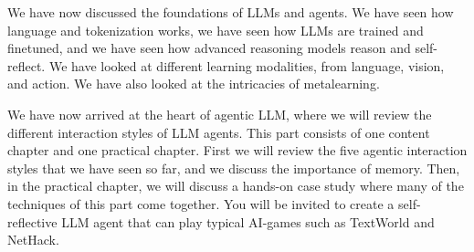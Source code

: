 We have now discussed the foundations of LLMs and agents. We have seen how language and tokenization works, we have seen how LLMs are trained and finetuned, and we have seen how advanced reasoning models reason and self-reflect. We have looked at different learning modalities, from language, vision, and action.  We have also looked at the intricacies of metalearning. 

We have now arrived at the heart of agentic LLM, where we will review the different interaction styles of LLM  agents.  This part consists of one content chapter and one practical chapter. First we will review the five agentic interaction styles that we have seen so far, and we discuss the importance of memory. Then, in the practical chapter, we will discuss a  hands-on case study where many of the techniques of this part come together. You will be invited to create a self-reflective LLM agent that can play typical AI-games such as TextWorld and NetHack.
